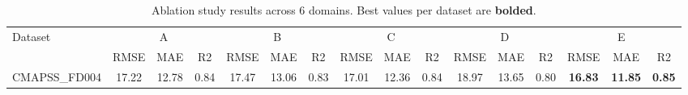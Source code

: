 \begin{table}[t]
\centering
\caption{Ablation study results across 6 domains. Best values per dataset are \textbf{bolded}.}
\label{tab:ablation}
\begin{tabular}{lccc|ccc|ccc|ccc|ccc}
\toprule
Dataset & \multicolumn{3}{c}{A} & \multicolumn{3}{c}{B} & \multicolumn{3}{c}{C} & \multicolumn{3}{c}{D} & \multicolumn{3}{c}{E} \\
 & RMSE & MAE & R2 & RMSE & MAE & R2 & RMSE & MAE & R2 & RMSE & MAE & R2 & RMSE & MAE & R2 \\
\midrule
CMAPSS_FD004 & 17.22 & 12.78 & 0.84 & 17.47 & 13.06 & 0.83 & 17.01 & 12.36 & 0.84 & 18.97 & 13.65 & 0.80 & \textbf{16.83} & \textbf{11.85} & \textbf{0.85} \\
\bottomrule
\end{tabular}
\end{table}